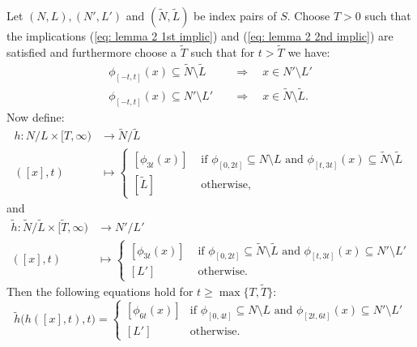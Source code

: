 \begin{lemma} \label{lem: index invariants lemma 3} Let $(N, L),(N',L')$ and $(\tilde{N},\tilde{L})$ be index pairs of $S$. Choose $T>0$ such that the implications (\ref{eq: lemma 2 1st implic}) and (\ref{eq: lemma 2 2nd implic}) are satisfied and furthermore choose a $\tilde{T}$ such that for $t> \tilde{T}$ we have:
\begin{align}
\phi_{[-t,t]}(x) \subseteq \tilde{N}\setminus \tilde{L} \quad & \Rightarrow \quad x\in N'\setminus L' \label{eq: lemma 3 1st implic} \\
\phi_{[-t,t]}(x) \subseteq N'\setminus L' \quad & \Rightarrow \quad x\in  \tilde{N}\setminus \tilde{L}.\label{eq: lemma 3 2nd implic} 
\end{align}
Now define:
\begin{align*}
h:N/L \times [T,\infty) & \to \tilde{N}/\tilde{L} \\
([x],t) & \mapsto 
\begin{cases}
[\phi_{3t}(x)] & \text{ if } \phi_{[0,2t]}\subseteq N\setminus L \text{ and } \phi_{[t,3t]}(x)\subseteq \tilde{N}\setminus \tilde{L}\\
[\tilde{L}] & \text{ otherwise,}
\end{cases}
\end{align*}
and 
\begin{align*}
\tilde{h}:\tilde{N} / \tilde{L} \times [\tilde{T},\infty) & \to N'/L' \\
([x],t) & \mapsto 
\begin{cases}
[\phi_{3t}(x)] & \text{ if } \phi_{[0,2t]}\subseteq \tilde{N} \setminus \tilde{L} \text{ and } \phi_{[t,3t]}(x)\subseteq N'\setminus L'\\
[L'] & \text{ otherwise.}
\end{cases}
\end{align*} 
Then the following equations hold for $t\geq \max\{T,\tilde{T}\}$:
\begin{equation*}
\tilde{h}\big(h([x],t),t\big)=
\begin{cases}
[\phi_{6t}(x)] & \text{if }\phi_{[0,4t]}\subseteq N\setminus L \text{ and } \phi_{[2t,6t]}(x)\subseteq N'\setminus L' \\
[L'] &\text{otherwise.}
\end{cases}
\end{equation*}
\end{lemma}
